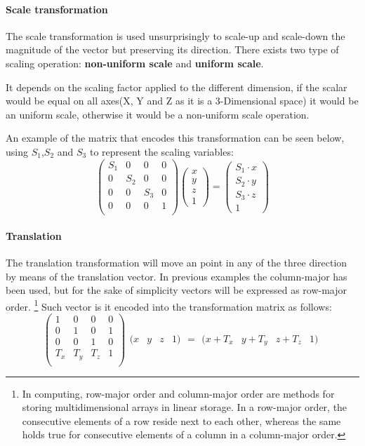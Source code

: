 \documentclass[12pt,a4paper]{extarticle}
\newcommand{\row}[1]{%
  \begin{matrix}(#1)\end{matrix}%
}
\begin{document}
\paragraph{Scale transformation} The scale transformation is used unsurprisingly to scale-up and scale-down the magnitude of the vector but preserving its direction. There exists two type of scaling operation: \textbf{non-uniform scale} and \textbf{uniform scale}. 

It depends on the scaling factor applied to the different dimension, if the scalar would be equal on all axes(X, Y and Z as it is a 3-Dimensional space) it would be an uniform scale, otherwise it would be a non-uniform scale operation. 

An example of the matrix that encodes this transformation can be seen below, using $S_{1}$,$S_{2}$ and $S_{3}$ to represent the scaling variables:
\[
\begin{pmatrix}
S_{1} & 0 & 0 & 0\\
0 & S_{2} & 0 & 0\\
0 & 0 & S_{3} & 0\\
0 & 0 & 0 & 1\\
\end{pmatrix}
\begin{pmatrix}
x\\
y\\
z\\
1
\end{pmatrix}
=
\begin{pmatrix}
S_{1} \cdot x\\
S_{2} \cdot y\\
S_{3} \cdot z \\
1
\end{pmatrix}
\]
\paragraph{Translation} The translation transformation will move an point in any of the three direction by means of the translation vector. In previous examples the column-major has been used, but for the sake of simplicity vectors will be expressed as row-major order. \footnote{In computing, row-major order and column-major order are methods for storing multidimensional arrays in linear storage. In a row-major order, the consecutive elements of a row reside next to each other, whereas the same holds true for consecutive elements of a column in a column-major order.}  %
Such vector is it encoded into the transformation matrix as follows:
\[
\begin{pmatrix}
1 & 0 & 0 & 0\\
0 & 1 & 0 & 1\\
0 & 0 & 1 & 0\\
T_{x} & T_{y} & T_{z} & 1\\
\end{pmatrix}
\row{x&y&z&1}
 = 
 \row{x+T_{x}&y+T_{y}&z+T_{z}&1}
\]
\end{document}
